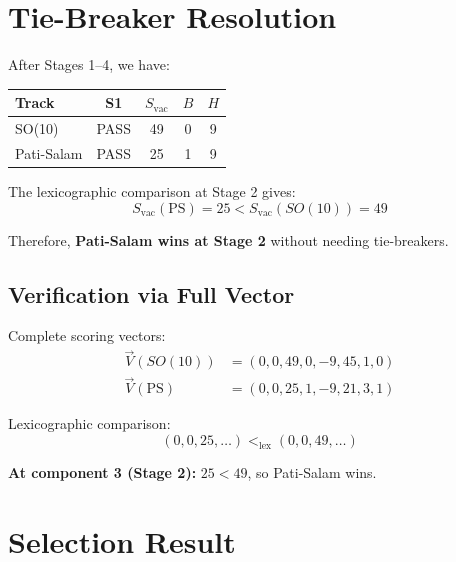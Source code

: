 \documentclass[11pt,a4paper]{article}
\begin{document}
\section{Tie-Breaker Resolution}
\label{sec:tiebreaker-impl}

After Stages 1--4, we have:
\begin{center}
\begin{tabular}{lcccc}
\toprule
Track & S1 & $S_{\text{vac}}$ & $B$ & $H$ \\
\midrule
SO(10) & PASS & 49 & 0 & 9 \\
Pati-Salam & PASS & 25 & 1 & 9 \\
\bottomrule
\end{tabular}
\end{center}

The lexicographic comparison at Stage 2 gives:
\begin{equation}
\label{eq:s2-comparison}
S_{\text{vac}}(\text{PS}) = 25 < S_{\text{vac}}(SO(10)) = 49
\end{equation}

Therefore, \textbf{Pati-Salam wins at Stage 2} without needing tie-breakers.

\subsection{Verification via Full Vector}
\label{subsec:full-vector}

Complete scoring vectors:
\begin{align}
\label{eq:vector-so10}
\vec{V}(SO(10)) &= (0, 0, 49, 0, -9, 45, 1, 0) \\
\label{eq:vector-ps}
\vec{V}(\text{PS}) &= (0, 0, 25, 1, -9, 21, 3, 1)
\end{align}

Lexicographic comparison:
\begin{equation}
\label{eq:lex-compare}
(0, 0, 25, \ldots) <_{\text{lex}} (0, 0, 49, \ldots)
\end{equation}

\textbf{At component 3 (Stage 2):} $25 < 49$, so Pati-Salam wins.

\section{Selection Result}
\label{sec:result}
\end{document}

